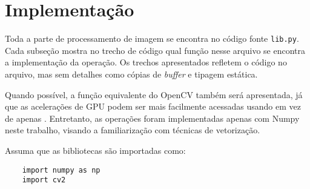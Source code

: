 \section{Implementação}

Toda a parte de processamento de imagem se encontra no código fonte \texttt{lib.py}. Cada subseção mostra no trecho de código qual função nesse arquivo se encontra a implementação da operação. Os trechos apresentados refletem o código no arquivo, mas sem detalhes como cópias de \textit{buffer} e tipagem estática.

Quando possível, a função equivalente do OpenCV também será apresentada, já que as acelerações de GPU podem ser mais facilmente acessadas usando  em vez de apenas  \autocite{ref:cvcuda}. Entretanto, as operações foram implementadas apenas com Numpy neste trabalho, visando a familiarização com técnicas de vetorização.

Assuma que as bibliotecas são importadas como:

\begin{verbatim}
    import numpy as np
    import cv2
\end{verbatim}









